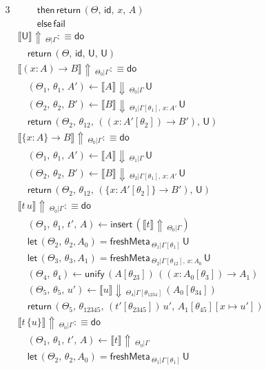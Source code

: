 \documentclass[acmsmall,review,anonymous,prologue,dvipsnames]{acmart}\settopmatter{printfolios=true,printccs=false,printacmref=false}
\newcommand{\slet}{\boldsymbol{\mathsf{let}}}
\renewcommand{\U}{\mathsf{U}}
\newcommand{\id}{\mathsf{id}}
\newcommand{\freshMeta}[3]{\mathsf{freshMeta}\,_{#1|#2}\,#3}
\newcommand{\unify}{\mathsf{unify}}
\newcommand{\fail}{\mathsf{fail}}
\newcommand{\echeck}[4]{\llbracket#1\rrbracket\!\Downarrow\,_{#2|#3}\,#4}
\newcommand{\einfer}[3]{\llbracket#1\rrbracket\!\Uparrow\,_{#2|#3}}
\newcommand{\edo}{\boldsymbol{\mathsf{do}}}
\newcommand{\ereturn}{\boldsymbol{\mathsf{return}}}
\newcommand{\ethen}{\boldsymbol{\mathsf{then}}}
\newcommand{\eelse}{\boldsymbol{\mathsf{else}}}
\newcommand{\einsert}{\mathsf{insert}}
\theoremstyle{remark}
\begin{document}
\begin{alignat*}{3}
  &\qquad   \ethen\, \ereturn\,(\Theta,\,\id,\,x,\,A)\\
  &\qquad   \eelse\, \fail\\
  &\einfer{\U}{\Theta}{\Gamma} :\equiv \edo\\
  &\quad\ereturn\,(\Theta,\,\id,\,\U,\,\U)\\
  &\einfer{(x : A)\to B}{\Theta_0}{\Gamma} :\equiv \edo\\
  &\quad(\Theta_1,\,\theta_1,\,A') \leftarrow \echeck{A}{\Theta_0}{\Gamma}{\U}\\
  &\quad(\Theta_2,\,\theta_2,\,B') \leftarrow
                 \echeck{B}{\Theta_1}{\Gamma[\theta_1],\,x : A'}{\U}\\
  &\quad\ereturn\,(\Theta_2,\,\theta_{12},
                 \,((x : A'[\theta_2])\to B'),\,\U)\\
  &\einfer{\{x : A\}\to B}{\Theta_0}{\Gamma} :\equiv \edo\\
  &\quad(\Theta_1,\,\theta_1,\,A') \leftarrow \echeck{A}{\Theta_1}{\Gamma}{\U}\\
  &\quad(\Theta_2,\,\theta_2,\,B') \leftarrow
                 \echeck{B}{\Theta_2}{\Gamma[\theta_1],\,x : A'}{\U}\\
  &\quad\ereturn\,(\Theta_2,\,\theta_{12},
                 \,(\{x : A'[\theta_2]\}\to B'),\,\U)\\
  &\einfer{t\,u}{\Theta_0}{\Gamma} :\equiv \edo \\
  &\quad (\Theta_1,\,\theta_1,\,t',\,A) \leftarrow \einsert\,(\einfer{t}{\Theta_0}{\Gamma})\\
  &\quad \slet\,(\Theta_2,\,\theta_2,A_0) = \freshMeta{\Theta_1}{\Gamma[\theta_1]}{\U}\\
  &\quad \slet\,(\Theta_3,\,\theta_3,A_1) = \freshMeta{\Theta_2}{\Gamma[\theta_{12}],\,x:A_0}{\U}\\
  &\quad (\Theta_4,\,\theta_4) \leftarrow \unify\,(A[\theta_{23}])\,((x : A_0[\theta_3])\to A_1)\\
  &\quad (\Theta_5,\,\theta_5,\,u') \leftarrow \echeck{u}{\Theta_4}{\Gamma[\theta_{1234}]}{(A_0[\theta_{34}])}\\
  &\quad \ereturn\,(\Theta_5,\,\theta_{12345},\,(t'[\theta_{2345}])\,u',\,A_1[\theta_{45}][x\mapsto u'])\\
  &\einfer{t\,\{u\}}{\Theta_0}{\Gamma} :\equiv \edo \\
  &\quad (\Theta_1,\,\theta_1,\,t',\,A) \leftarrow \einfer{t}{\Theta_0}{\Gamma}\\
  &\quad \slet\,(\Theta_2,\,\theta_2,A_0) = \freshMeta{\Theta_1}{\Gamma[\theta_1]}{\U}\\

\end{alignat*}
\end{document}
